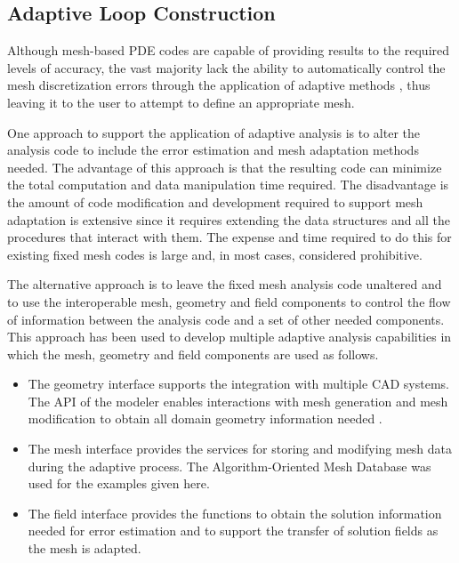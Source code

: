 \subsection{Adaptive Loop Construction}

Although mesh-based PDE 
codes are capable of providing results to the required levels of
accuracy, the vast majority lack the ability to automatically control
the mesh discretization errors through the application of adaptive
methods \cite{AiOd00,BaSt01,BaRa03}, thus leaving it to the user to
attempt to define an appropriate mesh.

One approach to support the application of adaptive analysis is to
alter the analysis code to include the error estimation and mesh
adaptation methods needed. The advantage of this approach is that the
resulting code can minimize the total computation and data
manipulation time required. The disadvantage is the amount of code
modification and development required to support mesh adaptation
is extensive since it requires extending the data structures
and all the procedures that interact with them. The expense and time
required to do this for existing fixed mesh codes is large and, in most
cases, considered prohibitive.

The alternative approach is to leave the fixed mesh analysis code
unaltered and to use the interoperable mesh, geometry and field
components to control the flow of information between the analysis
code and a set of other needed components. This approach has been used
to develop multiple adaptive analysis capabilities in which the
mesh, geometry and field components are used as follows.

\begin{itemize}
\item The geometry interface supports the integration with multiple
CAD systems. The API of the modeler enables interactions
with mesh generation and mesh modification to obtain all domain
geometry information needed \cite{BeWa04}.

\item The mesh interface provides the services for storing and
modifying mesh data during the adaptive process. The
Algorithm-Oriented Mesh Database \cite{ReSh03} was used for the examples given
here.

\item The field interface \cite{BeSh99} provides the functions to obtain
the solution information needed for error estimation and to support
the transfer of solution fields as the mesh is adapted.
\end{itemize}

